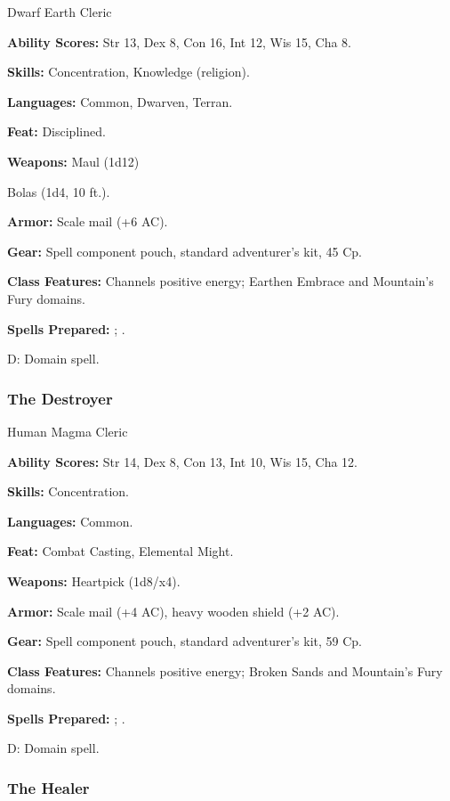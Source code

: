 Dwarf Earth Cleric

\textbf{Ability Scores:} Str 13, Dex 8, Con 16, Int 12, Wis 15, Cha 8.

\textbf{Skills:} Concentration, Knowledge (religion).

\textbf{Languages:} Common, Dwarven, Terran.

\textbf{Feat:} Disciplined.

\textbf{Weapons:} Maul (1d12)

Bolas (1d4, 10 ft.).

\textbf{Armor:} Scale mail (+6 AC).

\textbf{Gear:} Spell component pouch, standard adventurer's kit, 45 Cp.

\textbf{Class Features:} Channels positive energy; Earthen Embrace and Mountain's Fury domains.

\textbf{Spells Prepared:} ; .

D: Domain spell.

\subsubsection{The Destroyer}

Human Magma Cleric

\textbf{Ability Scores:} Str 14, Dex 8, Con 13, Int 10, Wis 15, Cha 12.

\textbf{Skills:} Concentration.

\textbf{Languages:} Common.

\textbf{Feat:} Combat Casting, Elemental Might.

\textbf{Weapons:} Heartpick (1d8/x4).

\textbf{Armor:} Scale mail (+4 AC), heavy wooden shield (+2 AC).

\textbf{Gear:} Spell component pouch, standard adventurer's kit, 59 Cp.

\textbf{Class Features:} Channels positive energy; Broken Sands and Mountain's Fury domains.

\textbf{Spells Prepared:} ; .

D: Domain spell.

\subsubsection{The Healer}


